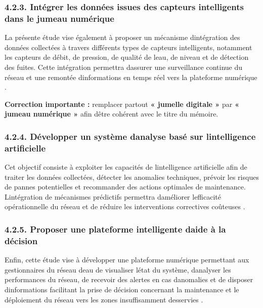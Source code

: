 \documentclass[12pt,a4paper,oneside]{report}
\begin{document}
\subsubsection{4.2.3. Intégrer les données issues des capteurs
intelligents dans le jumeau
numérique}\label{intuxe9grer-les-donnuxe9es-issues-des-capteurs-intelligents-dans-le-jumeau-numuxe9rique}

La présente étude vise également à proposer un mécanisme
d\textquotesingle intégration des données collectées à travers
différents types de capteurs intelligents, notamment les capteurs de
débit, de pression, de qualité de l\textquotesingle eau, de niveau et de
détection des fuites. Cette intégration permettra
d\textquotesingle assurer une surveillance continue du réseau et une
remontée d\textquotesingle informations en temps réel vers la plateforme
numérique \cite{ref7}.

\textbf{Correction importante :} remplacer partout \textbf{« jumelle
digitale »} par \textbf{« jumeau numérique »} afin
d\textquotesingle être cohérent avec le titre du mémoire.

\subsubsection{4.2.4. Développer un système d\textquotesingle analyse
basé sur l\textquotesingle intelligence
artificielle}\label{duxe9velopper-un-systuxe8me-danalyse-basuxe9-sur-lintelligence-artificielle}

Cet objectif consiste à exploiter les capacités de
l\textquotesingle intelligence artificielle afin de traiter les données
collectées, détecter les anomalies techniques, prévoir les risques de
pannes potentielles et recommander des actions optimales de maintenance.
L\textquotesingle intégration de mécanismes prédictifs permettra
d\textquotesingle améliorer l\textquotesingle efficacité opérationnelle
du réseau et de réduire les interventions correctives coûteuses
\cite{ref21}.

\subsubsection{4.2.5. Proposer une plateforme intelligente
d\textquotesingle aide à la
décision}\label{proposer-une-plateforme-intelligente-daide-uxe0-la-duxe9cision}

Enfin, cette étude vise à développer une plateforme numérique permettant
aux gestionnaires du réseau d\textquotesingle eau de visualiser
l\textquotesingle état du système, d\textquotesingle analyser les
performances du réseau, de recevoir des alertes en cas
d\textquotesingle anomalies et de disposer
d\textquotesingle informations facilitant la prise de décision
concernant la maintenance et le déploiement du réseau vers les zones
insuffisamment desservies \cite{ref20}.
\end{document}
